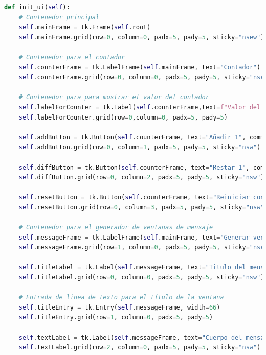 \begin{lstlisting}[language=Python,
                   style=python,
                   frame=none,
                   numbers=none,
                   basicstyle=\ttfamily\normalsize,
                   caption={Función \texttt{init\_ui} del ejemplo de Tkinter},
                   label=src:initUiExample,
                   inputencoding=utf8]                   
def init_ui(self):
    # Contenedor principal
    self.mainFrame = tk.Frame(self.root)
    self.mainFrame.grid(row=0, column=0, padx=5, pady=5, sticky="nsew")

    # Contenedor para el contador
    self.counterFrame = tk.LabelFrame(self.mainFrame, text="Contador")
    self.counterFrame.grid(row=0, column=0, padx=5, pady=5, sticky="nsew")

    # Contenedor para para mostrar el valor del contador
    self.labelForCounter = tk.Label(self.counterFrame,text=f"Valor del contador: {self.counter}")
    self.labelForCounter.grid(row=0,column=0, padx=5, pady=5)

    self.addButton = tk.Button(self.counterFrame, text="Añadir 1", command= lambda: self.addOneToCounter())
    self.addButton.grid(row=0, column=1, padx=5, pady=5, sticky="nsw")

    self.diffButton = tk.Button(self.counterFrame, text="Restar 1", command= lambda: self.diffOneToCounter())
    self.diffButton.grid(row=0, column=2, padx=5, pady=5, sticky="nsw")

    self.resetButton = tk.Button(self.counterFrame, text="Reiniciar contador", command= lambda: self.resetCounter())
    self.resetButton.grid(row=0, column=3, padx=5, pady=5, sticky="nsw")

    # Contenedor para el generador de ventanas de mensaje
    self.messageFrame = tk.LabelFrame(self.mainFrame, text="Generar ventana de informacion")
    self.messageFrame.grid(row=1, column=0, padx=5, pady=5, sticky="nsew")

    self.titleLabel = tk.Label(self.messageFrame, text="Titulo del mensaje:")
    self.titleLabel.grid(row=0, column=0, padx=5, pady=5, sticky="nsw")

    # Entrada de línea de texto para el título de la ventana
    self.titleEntry = tk.Entry(self.messageFrame, width=66)
    self.titleEntry.grid(row=1, column=0, padx=5, pady=5)

    self.textLabel = tk.Label(self.messageFrame, text="Cuerpo del mensaje:")
    self.textLabel.grid(row=2, column=0, padx=5, pady=5, sticky="nsw")


\end{lstlisting}
